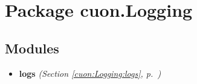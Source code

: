 %
%
%


\section{Package cuon.Logging}

    \label{cuon:Logging}


\subsection{Modules}

\begin{itemize}
\setlength{\parskip}{0ex}
\item \textbf{logs}
  \textit{(Section \ref{cuon:Logging:logs}, p.~\pageref{cuon:Logging:logs})}

\end{itemize}

